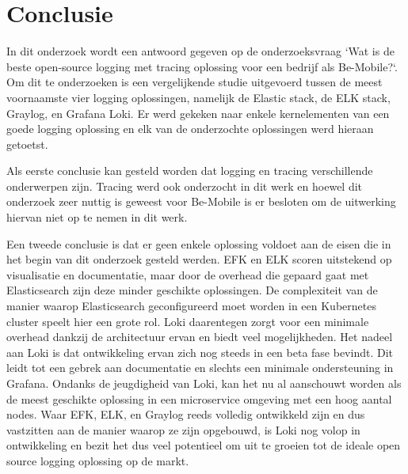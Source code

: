 
\chapter{Conclusie}
\label{ch:conclusie}



In dit onderzoek wordt een antwoord gegeven op de onderzoeksvraag `Wat is de beste open-source logging met tracing oplossing voor een bedrijf als Be-Mobile?`. Om dit te onderzoeken is een vergelijkende studie uitgevoerd tussen de meest voornaamste vier logging oplossingen, namelijk de Elastic stack, de ELK stack, Graylog, en Grafana Loki. Er werd gekeken naar enkele kernelementen van een goede logging oplossing en elk van de onderzochte oplossingen werd hieraan getoetst.

Als eerste conclusie kan gesteld worden dat logging en tracing verschillende onderwerpen zijn. Tracing werd ook onderzocht in dit werk en hoewel dit onderzoek zeer nuttig is geweest voor Be-Mobile is er besloten om de uitwerking hiervan niet op te nemen in dit werk.

Een tweede conclusie is dat er geen enkele oplossing voldoet aan de eisen die in het begin van dit onderzoek gesteld werden. EFK en ELK scoren uitstekend op visualisatie en documentatie, maar door de overhead die gepaard gaat met Elasticsearch zijn deze minder geschikte oplossingen. De complexiteit van de manier waarop Elasticsearch geconfigureerd moet worden in een Kubernetes cluster speelt hier een grote rol. Loki daarentegen zorgt voor een minimale overhead dankzij de architectuur ervan en biedt veel mogelijkheden. Het nadeel aan Loki is dat ontwikkeling ervan zich nog steeds in een beta fase bevindt. Dit leidt tot een gebrek aan documentatie en slechts een minimale ondersteuning in Grafana. Ondanks de jeugdigheid van Loki, kan het nu al aanschouwt worden als de meest geschikte oplossing in een microservice omgeving met een hoog aantal nodes. Waar EFK, ELK, en Graylog reeds volledig ontwikkeld zijn en dus vastzitten aan de manier waarop ze zijn opgebouwd, is Loki nog volop in ontwikkeling en bezit het dus veel potentieel om uit te groeien tot de ideale open source logging oplossing op de markt.

